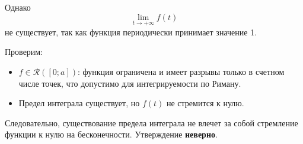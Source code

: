 \documentclass[a4paper]{article}
\begin{document}
\begin{enumerate}
    Однако \[ \lim_{t \to +\infty} f(t) \] не существует, так как функция периодически принимает значение 1.

    Проверим:
    \begin{itemize}
        \item 
        \( f \in \mathcal{R}([0; a]) \): функция ограничена и имеет разрывы только в счетном числе точек, что допустимо для интегрируемости по Риману.
        \item
        Предел интеграла существует, но \( f(t) \) не стремится к нулю.

    \end{itemize}

    Следовательно, существование предела интеграла не влечет за собой стремление функции к нулю на бесконечности. Утверждение \textbf{неверно}.

\end{enumerate}
\end{document}

